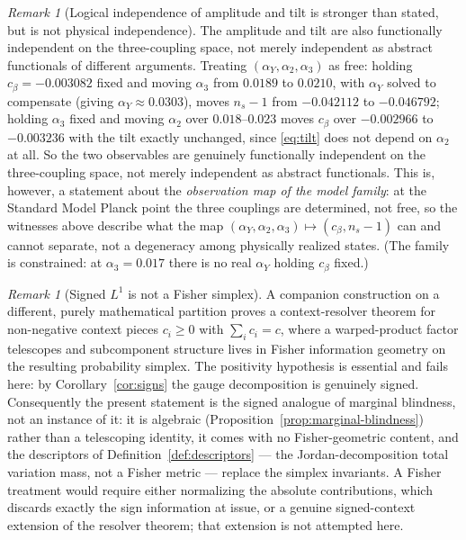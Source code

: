 \documentclass[11pt]{article}
\theoremstyle{definition}
\theoremstyle{remark}
\newtheorem{remark}[theorem]{Remark}
\begin{document}
\begin{remark}[Logical independence of amplitude and tilt is stronger than stated, but is not
physical independence]
\label{rem:functional-independence}
The amplitude and tilt are also functionally independent on the three-coupling space, not merely
independent as abstract functionals of different arguments. Treating $(\alpha_Y,\alpha_2,\alpha_3)$
as free: holding $c_\beta = -0.003082$ fixed and moving $\alpha_3$ from $0.0189$ to $0.0210$, with
$\alpha_Y$ solved to compensate (giving $\alpha_Y \approx 0.0303$), moves $n_s-1$ from $-0.042112$
to $-0.046792$; holding $\alpha_3$ fixed and moving $\alpha_2$ over $0.018$--$0.023$ moves $c_\beta$
over $-0.002966$ to $-0.003236$ with the tilt exactly unchanged, since \eqref{eq:tilt} does not
depend on $\alpha_2$ at all. So the two observables are genuinely functionally independent on the
three-coupling space, not merely independent as abstract functionals. This is, however, a statement
about the \emph{observation map of the model family}: at the Standard Model Planck point the three
couplings are determined, not free, so the witnesses above describe what the map $(\alpha_Y,\alpha_2,
\alpha_3) \mapsto (c_\beta, n_s-1)$ can and cannot separate, not a degeneracy among physically
realized states. (The family is constrained: at $\alpha_3 = 0.017$ there is no real $\alpha_Y$
holding $c_\beta$ fixed.)
\end{remark}

\begin{remark}[Signed $L^1$ is not a Fisher simplex]
\label{rem:not-fisher}
A companion construction on a different, purely mathematical partition \citep{DeJesusContextResolver2026}
proves a context-resolver theorem for non-negative context pieces $c_i \ge 0$ with $\sum_i c_i = c$,
where a warped-product factor telescopes and subcomponent structure lives in Fisher information
geometry on the resulting probability simplex. The positivity hypothesis is essential and fails
here: by Corollary~\ref{cor:signs} the gauge decomposition is genuinely signed. Consequently the
present statement is the signed analogue of marginal blindness, not an instance of it: it is
algebraic (Proposition~\ref{prop:marginal-blindness}) rather than a telescoping identity, it comes
with no Fisher-geometric content, and the descriptors of Definition~\ref{def:descriptors} --- the
Jordan-decomposition total variation mass, not a Fisher metric --- replace the simplex invariants.
A Fisher treatment would require either normalizing the absolute contributions, which discards
exactly the sign information at issue, or a genuine signed-context extension of the resolver
theorem; that extension is not attempted here.
\end{remark}
\end{document}
